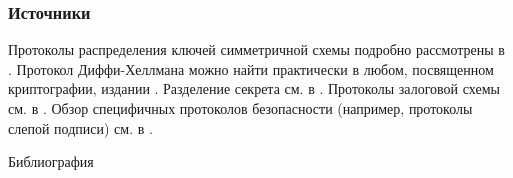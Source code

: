 \begin{frame}
    \frametitle{Источники}
    
    Протоколы распределения ключей симметричной схемы подробно рассмотрены в \cite{bib:smart:crypto}. Протокол Диффи-Хеллмана можно найти практически в любом, посвященном криптографии, издании \cite{bib:smart:crypto, bib:mao:modernCrypto, bib:shangin:protect}. Разделение секрета см. в \cite{bib:chmora:crypto,bib:smart:crypto}. Протоколы залоговой схемы см. в \cite{bib:mao:modernCrypto, bib:chmora:crypto}. Обзор специфичных протоколов безопасности (например, протоколы слепой подписи) см. в \cite{bib:shneir:applCrypto}.
\end{frame}


\begin{frame}[allowframebreaks]{Библиография}
    
    
\end{frame}



